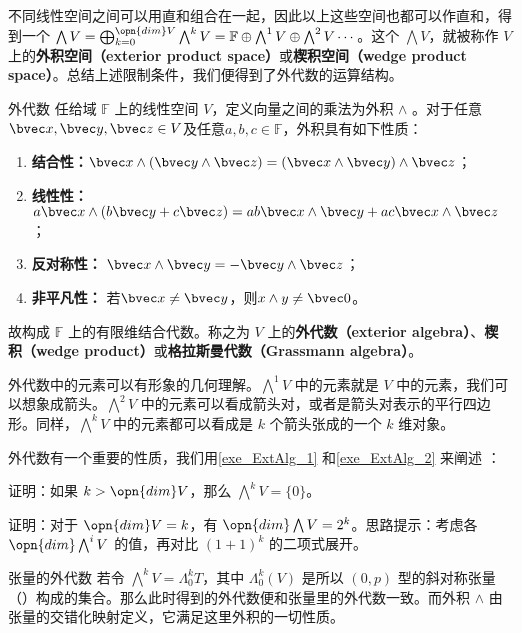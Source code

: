 不同线性空间之间可以用直和组合在一起，因此以上这些空间也都可以作直和，得到一个 $\bigwedge V=\bigoplus^{\opn{dim}V}_{k=0}\bigwedge^k V=\mathbb{F}\oplus\bigwedge^1V\oplus\bigwedge^2V\cdots$。这个 $\bigwedge V$，就被称作 $V$ 上的\textbf{外积空间（exterior product space）}或\textbf{楔积空间（wedge product space）}。总结上述限制条件，我们便得到了外代数的运算结构。
\begin{definition}{外代数}
任给域 $\mathbb{F}$ 上的线性空间 $V$，定义向量之间的乘法为外积 $\wedge$ 。对于任意$\bvec x,\bvec y,\bvec z\in V$及任意$a,b,c\in \mathbb F$，外积具有如下性质：
\begin{enumerate}
\item \textbf{结合性：}$\bvec x\wedge (\bvec y\wedge \bvec z)=(\bvec x\wedge \bvec y)\wedge \bvec z$；
\item \textbf{线性性：}$a\bvec x\wedge(b\bvec y+c\bvec z)=ab\bvec x\wedge \bvec y+ac\bvec x\wedge\bvec z$；
\item \textbf{反对称性：} $\bvec x\wedge \bvec y=-\bvec y\wedge\bvec z$；
\item \textbf{非平凡性：} 若$\bvec x\neq\bvec y$，则$x\wedge y\neq \bvec 0 $。
\end{enumerate}

故构成 $\mathbb{F}$ 上的有限维结合代数。称之为 $V$ 上的\textbf{外代数（exterior algebra）}、\textbf{楔积（wedge product）}或\textbf{格拉斯曼代数（Grassmann algebra）}。
\end{definition}


外代数中的元素可以有形象的几何理解。$\bigwedge^1 V$ 中的元素就是 $V$ 中的元素，我们可以想象成箭头。$\bigwedge^2 V$ 中的元素可以看成箭头对，或者是箭头对表示的平行四边形。同样，$\bigwedge^k V$ 中的元素都可以看成是 $k$ 个箭头张成的一个 $k$ 维对象。

外代数有一个重要的性质，我们用\autoref{exe_ExtAlg_1} 和\autoref{exe_ExtAlg_2} 来阐述 ：

\begin{exercise}{}\label{exe_ExtAlg_1}
证明：如果 $k>\opn{dim} V$，那么 $\bigwedge^kV=\{0\}$。
\end{exercise}

\begin{exercise}{}\label{exe_ExtAlg_2}
证明：对于 $\opn{dim} V=k$，有 $\opn{dim} \bigwedge V=2^k$。思路提示：考虑各 $\opn{dim}\bigwedge^iV$ 的值，再对比 $(1+1)^k$ 的二项式展开。
\end{exercise}
\begin{example}{张量的外代数}
若令 $\bigwedge^k V=\Lambda^k_0 T$，其中 $\Lambda^k_0(V)$ 是所以 $(0,p)$ 型的斜对称张量（）构成的集合。那么此时得到的外代数便和张量里的外代数一致。而外积 $\wedge$ 由张量的交错化映射定义，它满足这里外积的一切性质。
\end{example}



